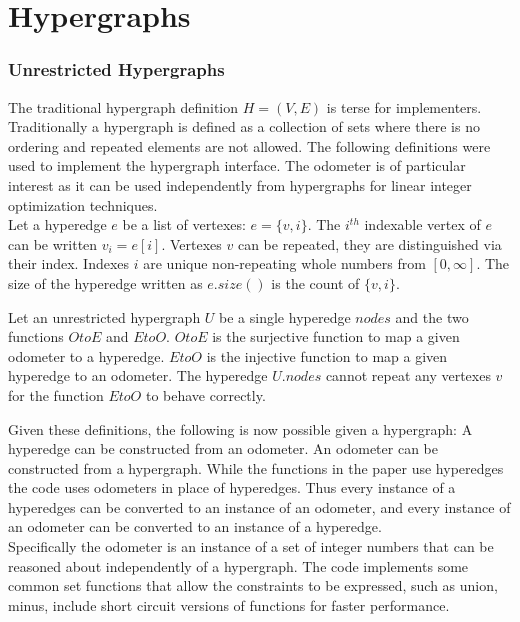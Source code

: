 \chapter{Hypergraphs}
\subsection{Unrestricted Hypergraphs}
The traditional hypergraph definition $H=(V,E)$ is terse for implementers. Traditionally a hypergraph is defined as a collection of sets where there is no ordering and repeated elements are not allowed. The following definitions were used  to implement the hypergraph interface. The odometer is of particular interest as it can be used independently from hypergraphs for linear integer optimization techniques.\\

Let a hyperedge $e$ be a list of vertexes: $e =\{v,i\}$. The $i^{th}$ indexable vertex of $e$ can be written $v_i = e[i]$. Vertexes $v$ can be repeated, they are distinguished via their index. Indexes $i$ are unique non-repeating whole numbers from $[0,\infty]$. The size of the hyperedge written as $e.size()$ is the count of $\{v,i\}$.

\begin{definition}
Let an unrestricted hypergraph $U$ be a single hyperedge $nodes$ and the two functions $OtoE$ and $EtoO$. $OtoE$ is the surjective function to map a given odometer to a hyperedge. $EtoO$ is the injective function to map a given hyperedge to an odometer. The hyperedge $U.nodes$ cannot repeat any vertexes $v$ for the function $EtoO$ to behave correctly.
\end{definition}

Given these definitions, the following is now possible given a hypergraph: A hyperedge can be constructed from an odometer. An odometer can be constructed from a hypergraph. While the functions in the paper use hyperedges the code uses odometers in place of hyperedges. Thus every instance of a hyperedges can be converted to an instance of an odometer, and every instance of an odometer can be converted to an instance of a hyperedge.\\

Specifically the odometer is an instance of a set of integer numbers that can be reasoned about independently of a hypergraph. The code implements some common set functions that allow the constraints to be expressed, such as union, minus, include short circuit versions of functions for faster performance. 

